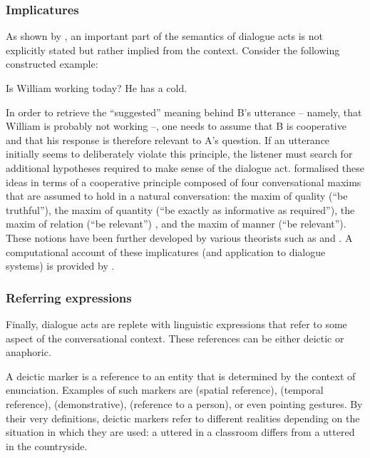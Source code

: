 \subsubsection*{Implicatures}
As shown by \cite{Grice1989}, an important part of the semantics of dialogue acts is not explicitly stated but rather implied from the context.  Consider the following constructed example: 
\begin{center}
\begin{dialogue}
 Is William working today?
 He has a cold.
\end{dialogue}
\end{center}
In order to retrieve the ``suggested'' meaning behind B's utterance -- namely, that William is probably not working --, one needs to assume that B is cooperative and that his response is therefore relevant to A's question.  If an utterance initially seems to deliberately violate this principle, the listener must search for additional hypotheses required to make sense of the dialogue act. \cite{Grice1989} formalised these ideas in terms of a cooperative principle composed of four conversational maxims that are assumed to hold in a natural conversation: the maxim of quality (``be truthful''), the maxim of quantity (``be exactly as informative as required''), the maxim of relation (``be relevant'') , and the maxim of manner (``be relevant'').  These notions have been further developed by various theorists such as \cite{wilson2002relevance} and \cite{horn2008handbook}.  A computational account of these implicatures (and application to dialogue systems) is provided by \cite{benotti2010implicature}. 

\subsubsection*{Referring expressions}

Finally, dialogue acts are replete with linguistic expressions that refer to some aspect of the conversational context.  These references can be either deictic or anaphoric. 

A deictic marker is a reference to an entity that is determined by the context of enunciation.  Examples of such markers are  (spatial reference),  (temporal reference),  (demonstrative),  (reference to a person), or even pointing gestures. By their very definitions, deictic markers refer to different realities depending on the situation in which they are used: a  uttered in a classroom differs from a  uttered in the countryside.  

